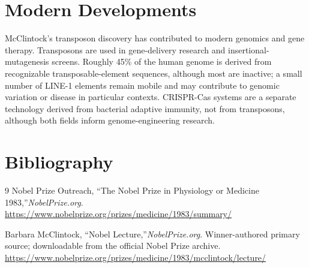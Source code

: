 \section{Modern Developments}

McClintock's transposon discovery has contributed to modern genomics and gene therapy. Transposons are used in gene-delivery research and insertional-mutagenesis screens. Roughly 45\% of the human genome is derived from recognizable transposable-element sequences, although most are inactive; a small number of LINE-1 elements remain mobile and may contribute to genomic variation or disease in particular contexts. CRISPR-Cas systems are a separate technology derived from bacterial adaptive immunity, not from transposons, although both fields inform genome-engineering research.


\section{Bibliography}

\begin{thebibliography}{9}
Nobel Prize Outreach, ``The Nobel Prize in Physiology or Medicine 1983,''\emph{NobelPrize.org}.\\
\url{https://www.nobelprize.org/prizes/medicine/1983/summary/}

Barbara McClintock, ``Nobel Lecture,''\emph{NobelPrize.org}. Winner-authored primary source; downloadable from the official Nobel Prize archive.\\
\url{https://www.nobelprize.org/prizes/medicine/1983/mcclintock/lecture/}
\end{thebibliography}
